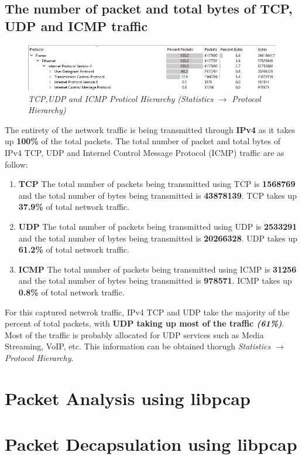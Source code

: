 \documentclass[a4paper,11pt]{article}
\begin{document}
\subsection{The number of packet and total bytes of TCP, UDP and ICMP traffic }
\begin{figure}[h!]
	\includegraphics[width = 16cm]{Traffic}
	\caption{\textit{TCP,UDP and ICMP Proticol Hierarchy (Statistics $\rightarrow$ Protocol Hierarchy)}}
\end{figure}
The entirety of the network traffic is being transmitted through \textbf{IPv4} as it takes up \textbf{100\%} of the total packets.
The total number of packet and total bytes of IPv4 TCP, UDP and Internel Control Message Protocol (ICMP) traffic are as follow:
\begin{enumerate}
	\item \textbf{TCP}
	\newline
	The total number of packets being transmitted using TCP is \textbf{1568769} and  the total number of bytes being transmitted is \textbf{43878139}.
	TCP takes up \textbf{37.9\%} of total network traffic.
	\item \textbf{UDP}
	\newline
	The total number of packets being transmitted using UDP is \textbf{2533291} and  the total number of bytes being transmitted is \textbf{20266328}. 	
	UDP takes up \textbf{61.2\%} of total network traffic.
	\item \textbf{ICMP}
	\newline
	The total number of packets being transmitted using ICMP is \textbf{31256} and  the total number of bytes being transmitted is \textbf{978571}. 	
	ICMP takes up \textbf{0.8\%} of total network traffic.
\end{enumerate}
For this captured netwrok traffic, IPv4 TCP and UDP take the majority of the percent of total packets, with \textbf{UDP taking up most of the traffic \textit{(61\%)}}. Most of the traffic is probably allocated for UDP services such as Media Streaming, VoIP, etc.
This information can be obtained thorugh \textit{Statistics $\rightarrow$ Protocol Hierarchy}.

\section{Packet Analysis using libpcap}

\section{Packet Decapsulation using libpcap}
\end{document}
